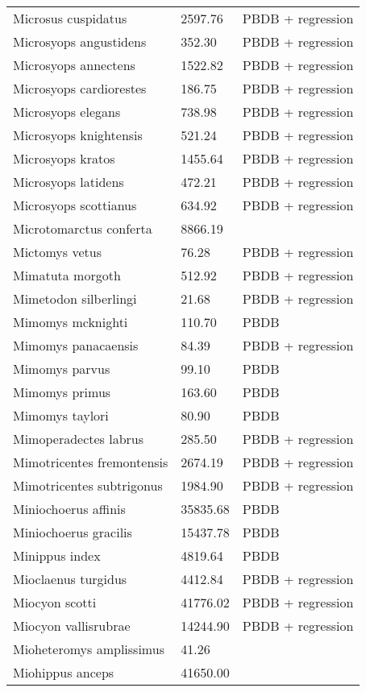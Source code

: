 \documentclass{article}
\begin{document}
\begin{center}
\begin{longtable}{p{} p{} p{} }
  Microsus cuspidatus & 2597.76 & PBDB + regression \\ 
  Microsyops angustidens & 352.30 & PBDB + regression \\ 
  Microsyops annectens & 1522.82 & PBDB + regression \\ 
  Microsyops cardiorestes & 186.75 & PBDB + regression \\ 
  Microsyops elegans & 738.98 & PBDB + regression \\ 
  Microsyops knightensis & 521.24 & PBDB + regression \\ 
  Microsyops kratos & 1455.64 & PBDB + regression \\ 
  Microsyops latidens & 472.21 & PBDB + regression \\ 
  Microsyops scottianus & 634.92 & PBDB + regression \\ 
  Microtomarctus conferta & 8866.19 & \cite{Tomiya2013} \\ 
  Mictomys vetus & 76.28 & PBDB + regression \\ 
  Mimatuta morgoth & 512.92 & PBDB + regression \\ 
  Mimetodon silberlingi & 21.68 & PBDB + regression \\ 
  Mimomys mcknighti & 110.70 & PBDB \\ 
  Mimomys panacaensis & 84.39 & PBDB + regression \\ 
  Mimomys parvus & 99.10 & PBDB \\ 
  Mimomys primus & 163.60 & PBDB \\ 
  Mimomys taylori & 80.90 & PBDB \\ 
  Mimoperadectes labrus & 285.50 & PBDB + regression \\ 
  Mimotricentes fremontensis & 2674.19 & PBDB + regression \\ 
  Mimotricentes subtrigonus & 1984.90 & PBDB + regression \\ 
  Miniochoerus affinis & 35835.68 & PBDB \\ 
  Miniochoerus gracilis & 15437.78 & PBDB \\ 
  Minippus index & 4819.64 & PBDB \\ 
  Mioclaenus turgidus & 4412.84 & PBDB + regression \\ 
  Miocyon scotti & 41776.02 & PBDB + regression \\ 
  Miocyon vallisrubrae & 14244.90 & PBDB + regression \\ 
  Mioheteromys amplissimus & 41.26 & \cite{Tomiya2013} \\ 
  Miohippus anceps & 41650.00 & \cite{McKenna2011} \\ 

\end{longtable}
\end{center}
\end{document}
